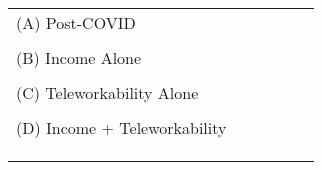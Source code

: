 \clearpage

\begin{table}[hbtp!]
  \centering
  \begin{tabular}{l c c c c c}
    \toprule
     \\
    \midrule
    (A) Post-COVID \\
    \midrule
     \\
    \midrule
    (B) Income Alone \\
    \midrule
     \\
    \midrule
    (C) Teleworkability Alone \\
    \midrule
     \\
    \midrule
    (D) Income + Teleworkability \\
    \midrule
     \\
    \midrule
     \\
    \midrule
     \\
    \bottomrule
  \end{tabular}
\end{table}
